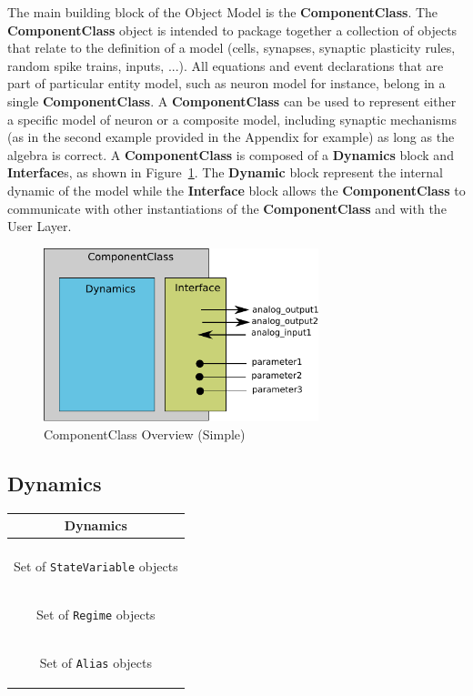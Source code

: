 \documentclass{article}
\newcommand{\ComponentClass}{{\bf{ComponentClass}}\xspace}
\newcommand{\Dynamics}{{\bf{Dynamics}}\xspace}
\newcommand{\Dynamic}{{\bf{Dynamic}}\xspace}
\newcommand{\Interface}{{\bf{Interface}}\xspace}
\newcommand{\Interfaces}{{\bf{Interface}}s\xspace}
\begin{document}
The main building block of the Object Model is the \ComponentClass.
The \ComponentClass object is intended to package together a collection of
objects that relate to the definition of a model (cells, synapses, synaptic
plasticity rules, random spike trains, inputs, ...).
All equations and event declarations that are part of particular entity
model, such as neuron model for instance, belong in a single \ComponentClass.
A \ComponentClass can be used to represent either a specific model of neuron or a
composite model, including synaptic mechanisms (as in the second example
provided in the Appendix for example) as long as the algebra is correct.
A \ComponentClass is composed of a \Dynamics block and \Interfaces, as shown
in Figure~\ref{fig:EX1_RegimeGraph}. The \Dynamic block represent the internal
dynamic of the model while the \Interface block allows the \ComponentClass to
communicate with other instantiations of the \ComponentClass and with the User
Layer.

\begin{figure}[htb!]
\center
\includegraphics[width=8cm]{figures/component_simple.pdf}
\protect\caption{ComponentClass Overview (Simple)}
\label{fig:EX1_RegimeGraph}
\end{figure}

\subsection{Dynamics}


\begin{table}[htb]
\center
\begin{tabular}{|c|}
\hline
\hline
Dynamics \\
\hline \\
\colorbox{issuecolor}{\parbox{0.4\linewidth}
{\center Set of {\tt StateVariable} objects}} \\
\hline
\colorbox{issuecolor}{\parbox{0.4\linewidth}
{\center Set of {\tt Regime} objects}} \\
\hline
\colorbox{issuecolor}{\parbox{0.4\linewidth}
{\center Set of {\tt Alias} objects}} \\
\hline
\end{tabular}
\end{table}
\end{document}
